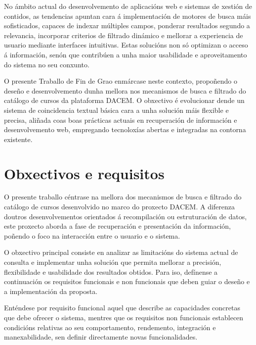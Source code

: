 \documentclass[%
    a4paper,               %
    twoside,                %
    parskip=full,           %
    10pt,                   %
    titlepage=on,           %
    captions=tableabove,    %
]{article}                  %
\begin{document}
No ámbito actual do desenvolvemento de aplicacións web e sistemas de xestión de contidos, as tendencias apuntan cara á implementación de motores de busca máis sofisticados, capaces de indexar múltiples campos, ponderar resultados segundo a relevancia, incorporar criterios de filtrado dinámico e mellorar a experiencia de usuario mediante interfaces intuitivas. Estas solucións non só optimizan o acceso á información, senón que contribúen a unha maior usabilidade e aproveitamento do sistema no seu conxunto.

O presente Traballo de Fin de Grao enmárcase neste contexto, propoñendo o deseño e desenvolvemento dunha mellora nos mecanismos de busca e filtrado do catálogo de cursos da plataforma DACEM. O obxectivo é evolucionar dende un sistema de coincidencia textual básica cara a unha solución máis flexible e precisa, aliñada coas boas prácticas actuais en recuperación de información e desenvolvemento web, empregando tecnoloxías abertas e integradas na contorna existente.

\section{Obxectivos e requisitos}
O presente traballo céntrase na mellora dos mecanismos de busca e filtrado do catálogo de cursos desenvolvido no marco do proxecto DACEM. A diferenza doutros desenvolvementos orientados á recompilación ou estruturación de datos, este proxecto aborda a fase de recuperación e presentación da información, poñendo o foco na interacción entre o usuario e o sistema.

O obxectivo principal consiste en analizar as limitacións do sistema actual de consulta e implementar unha solución que permita mellorar a precisión, flexibilidade e usabilidade dos resultados obtidos. Para iso, defínense a continuación os requisitos funcionais e non funcionais que deben guiar o deseño e a implementación da proposta.

Enténdese por requisito funcional aquel que describe as capacidades concretas que debe ofrecer o sistema, mentres que os requisitos non funcionais establecen condicións relativas ao seu comportamento, rendemento, integración e manexabilidade, sen definir directamente novas funcionalidades.

\end{document}
